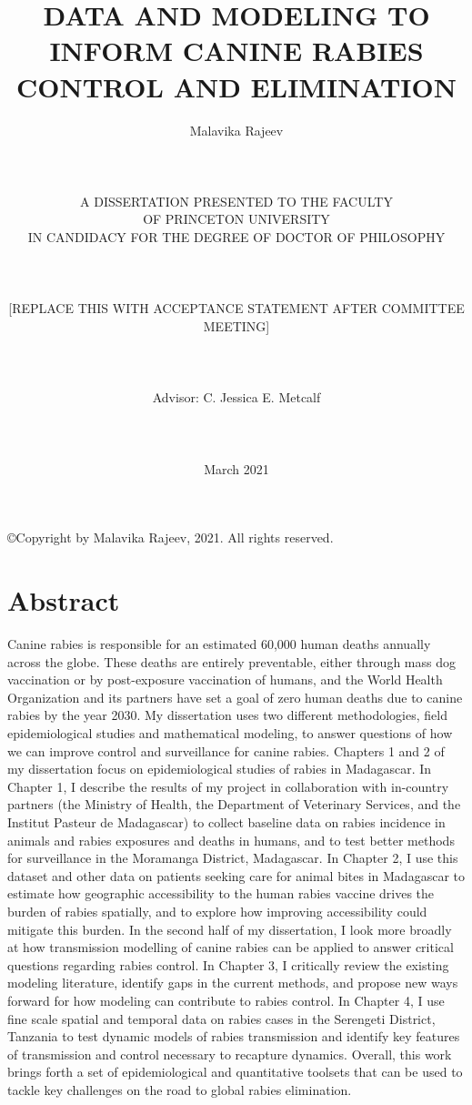 \documentclass[
]{book}
\title{DATA AND MODELING TO INFORM CANINE RABIES CONTROL AND ELIMINATION\\}
\author{}
\date{\vspace{-2.5em}Malavika Rajeev\\
~\\
~\\
~\\
A DISSERTATION PRESENTED TO THE FACULTY\\
OF PRINCETON UNIVERSITY\\
IN CANDIDACY FOR THE DEGREE OF DOCTOR OF PHILOSOPHY\\
~\\
~\\
~\\
{[}REPLACE THIS WITH ACCEPTANCE STATEMENT AFTER COMMITTEE MEETING{]}\\
~\\
~\\
~\\
Advisor: C. Jessica E. Metcalf\\
~\\
~\\
~\\
March 2021}
\begin{document}
\maketitle


\begin{center}

\copyright  Copyright by Malavika Rajeev, 2021. All rights reserved.

\end{center}

\frontmatter

\setcounter{page}{3}  %

\section*{Abstract}

Canine rabies is responsible for an estimated 60,000 human deaths annually across the globe. These deaths are entirely preventable, either through mass dog vaccination or by post-exposure vaccination of humans, and the World Health Organization and its partners have set a goal of zero human deaths due to canine rabies by the year 2030. My dissertation uses two different methodologies, field epidemiological studies and mathematical modeling, to answer questions of how we can improve control and surveillance for canine rabies. Chapters 1 and 2 of my dissertation focus on epidemiological studies of rabies in Madagascar. In Chapter 1, I describe the results of my project in collaboration with in-country partners (the Ministry of Health, the Department of Veterinary Services, and the Institut Pasteur de Madagascar) to collect baseline data on rabies incidence in animals and rabies exposures and deaths in humans, and to test better methods for surveillance in the Moramanga District, Madagascar. In Chapter 2, I use this dataset and other data on patients seeking care for animal bites in Madagascar to estimate how geographic accessibility to the human rabies vaccine drives the burden of rabies spatially, and to explore how improving accessibility could mitigate this burden. In the second half of my dissertation, I look more broadly at how transmission modelling of canine rabies can be applied to answer critical questions regarding rabies control. In Chapter 3, I critically review the existing modeling literature, identify gaps in the current methods, and propose new ways forward for how modeling can contribute to rabies control. In Chapter 4, I use fine scale spatial and temporal data on rabies cases in the Serengeti District, Tanzania to test dynamic models of rabies transmission and identify key features of transmission and control necessary to recapture dynamics. Overall, this work brings forth a set of epidemiological and quantitative toolsets that can be used to tackle key challenges on the road to global rabies elimination. 
\end{document}
